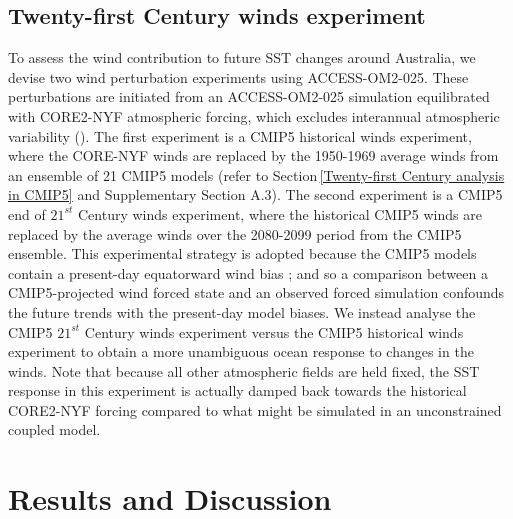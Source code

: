 \documentclass[draft,linenumbers]{agujournal2018}
\begin{document}
\subsection{Twenty-first Century winds experiment} \label{Twenty-first Century winds experiment}
To assess the wind contribution to future SST changes around Australia, we devise two wind perturbation experiments using ACCESS-OM2-025. These perturbations are initiated from an ACCESS-OM2-025 simulation equilibrated with CORE2-NYF atmospheric forcing, which excludes interannual atmospheric variability (\citealp{Large2009}). The first experiment is a CMIP5 historical winds experiment, where the CORE-NYF winds are replaced by the 1950-1969 average winds from an ensemble of 21 CMIP5 models (refer to Section\,\ref{Twenty-first Century analysis in CMIP5} and Supplementary Section A.3). The second experiment is a CMIP5 end of $21^{st}$ Century winds experiment, where the historical CMIP5 winds are replaced by the average winds over the 2080-2099 period from the CMIP5 ensemble. This experimental strategy is adopted because the CMIP5 models contain a present-day equatorward wind bias \citep{Bracegirdle2013}; and so a comparison between a CMIP5-projected wind forced state and an observed forced simulation confounds the future trends with the present-day model biases. We instead analyse the CMIP5 $21^{st}$ Century winds experiment versus the CMIP5 historical winds experiment to obtain a more unambiguous ocean response to changes in the winds. Note that because all other atmospheric fields are held fixed, the SST response in this experiment is actually damped back towards the historical CORE2-NYF forcing compared to what might be simulated in an unconstrained coupled model.

\section{Results and Discussion}
\end{document}
